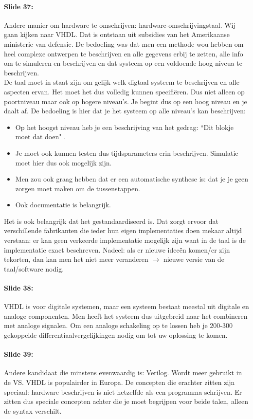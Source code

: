 \documentclass[10pt,a4paper]{book}
\begin{document}
\paragraph{Slide 37:} Andere manier om hardware te omschrijven: hardware-omschrijvingstaal. Wij gaan kijken naar VHDL. Dat is ontstaan uit subsidies van het Amerikaanse ministerie van defensie. De bedoeling was dat men een methode wou hebben om heel complexe ontwerpen te beschrijven en alle gegevens erbij te zetten, alle info om te simuleren en beschrijven en dat systeem op een voldoende hoog niveua te beschrijven.\\
De taal moet in staat zijn om gelijk welk digtaal systeem te beschrijven en alle aspecten ervan. Het moet het dus volledig kunnen specifi\"eren. Dus niet alleen op poortniveau maar ook op hogere niveau's. Je begint dus op een hoog niveau en je daalt af. De bedoeling is hier dat je het systeem op alle niveau's kan beschrijven:
\begin{itemize}
\item Op het hoogst niveau heb je een beschrijving van het gedrag: ``Dit blokje moet dat doen" . 
\item Je moet ook kunnen testen dus tijdsparameters erin beschrijven. Simulatie moet hier dus ook mogelijk zijn. 
\item Men zou ook graag hebben dat er een automatische synthese is: dat je je geen zorgen moet maken om de tussenstappen. 
\item Ook documentatie is belangrijk. 
\end{itemize}
Het is ook belangrijk dat het gestandaardiseerd is. Dat zorgt ervoor dat verschillende fabrikanten die ieder hun eigen implementaties doen mekaar altijd verstaan: er kan geen verkeerde implementatie mogelijk zijn want in de taal is de implementatie exact beschreven. Nadeel: als er nieuwe idee\"en komen/er zijn tekorten, dan kan men het niet meer veranderen $\rightarrow$ nieuwe versie van de taal/software nodig.

\paragraph{Slide 38:} VHDL is voor digitale systemen, maar een systeem bestaat meestal uit digitale en analoge componenten. Men heeft het systeem dus uitgebreid naar het combineren met analoge signalen. Om een analoge schakeling op te lossen heb je 200-300 gekoppelde differentiaalvergelijkingen nodig om tot uw oplossing te komen. 

\paragraph{Slide 39:} Andere kandidaat die minstens evenwaardig is: Verilog. Wordt meer gebruikt in de VS. VHDL is populairder in Europa. De concepten die erachter zitten zijn speciaal: hardware beschrijven is niet hetzelfde als een programma schrijven. Er zitten dus speciale concepten achter die je moet begrijpen voor beide talen, alleen de syntax verschilt. 
\end{document}
